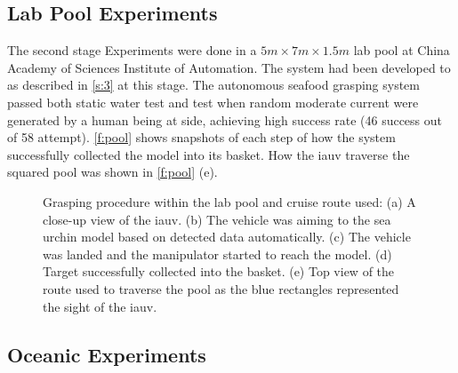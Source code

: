 \subsection{Lab Pool Experiments}

The second stage Experiments were done in a \(5m\times7m\times1.5m\) lab pool at
China Academy of Sciences Institute of Automation. The system had been developed
to as described in \autoref{s:3} at this stage. The autonomous seafood grasping
system passed both static water test and test when random moderate current were
generated by a human being at side, achieving high success rate (46 success out
of 58 attempt). \autoref{f:pool} shows snapshots of each step of how the system
successfully collected the model into its basket. How the \gls{iauv} traverse
the squared pool was shown in \autoref{f:pool} (e).

\begin{figure}[htb]
    \caption[Grasping Procedure within the Lab Pool and Cruise Route
    Used]{Grasping procedure within the lab pool and cruise route used: (a) A
    close-up view of the \gls{iauv}. (b) The vehicle was aiming to the sea
    urchin model based on detected data automatically. (c) The vehicle was
    landed and the manipulator started to reach the model. (d) Target
    successfully collected into the basket. (e) Top view of the route used to
    traverse the pool as the blue rectangles represented the sight of the
    \gls{iauv}.}\label{f:pool}
\end{figure}

\subsection{Oceanic Experiments}

